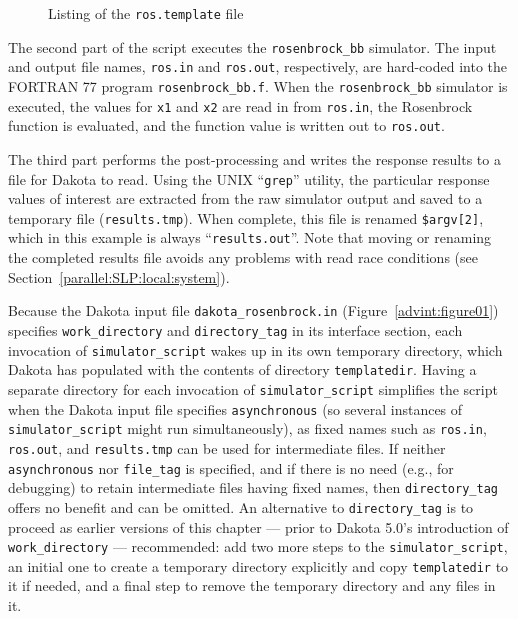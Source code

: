\begin{figure}
  \centering
  \begin{bigbox}
    \begin{small}
    \end{small}
  \end{bigbox}
  \caption{Listing of the \texttt{ros.template} file}
  \label{advint:figure04}
\end{figure}

The second part of the script executes the \texttt{rosenbrock\_bb}
simulator. The input and output file names, \texttt{ros.in} and
\texttt{ros.out}, respectively, are hard-coded into the FORTRAN 77
program \texttt{rosenbrock\_bb.f}. When the \texttt{rosenbrock\_bb}
simulator is executed, the values for \texttt{x1} and \texttt{x2} are
read in from \texttt{ros.in}, the Rosenbrock function is evaluated,
and the function value is written out to \texttt{ros.out}.

The third part performs the post-processing and writes the response
results to a file for Dakota to read. Using the UNIX ``\texttt{grep}'' utility, the
particular response values of interest are extracted from the raw
simulator output and saved to a temporary file (\texttt{results.tmp}).
When complete, this file is renamed \texttt{\$argv[2]}, which in this
example is always ``\texttt{results.out}''.
Note that moving or renaming the completed results file
avoids any problems with read race
conditions (see Section~\ref{parallel:SLP:local:system}).


Because the Dakota input file \texttt{dakota\_rosenbrock.in}
(Figure~\ref{advint:figure01}) specifies
\texttt{work\_directory} and \texttt{directory\_tag} in its interface
section, each invocation of \texttt{simulator\_script} wakes up in
its own temporary directory, which Dakota has populated with the
contents of directory \texttt{templatedir}. Having a separate directory
for each invocation of \texttt{simulator\_script} simplifies the script
when the Dakota input file specifies \texttt{asynchronous} (so
several instances of \texttt{simulator\_script} might run simultaneously),
as fixed names such as \texttt{ros.in}, \texttt{ros.out}, and \texttt{results.tmp}
can be used for intermediate files. If neither \texttt{asynchronous} nor
\texttt{file\_tag} is specified, and if there is no need (e.g., for debugging)
to retain intermediate files having fixed names, then \texttt{directory\_tag}
offers no benefit and can be omitted. An alternative to \texttt{directory\_tag}
is to proceed as earlier versions of this chapter --- prior to Dakota 5.0's
introduction of \texttt{work\_directory} --- recommended:  add two more
steps to the \texttt{simulator\_script},
an initial one to create a temporary directory explicitly and
copy \texttt{templatedir} to it if needed, and a final step to remove the temporary
directory and any files in it.

